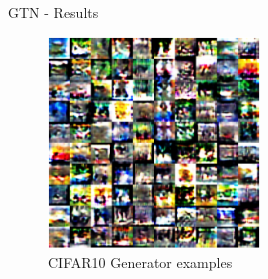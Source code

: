 \documentclass[10pt,usenames,dvipsnames]{beamer}
\begin{document}
\begin{frame}{GTN - Results}
    \begin{figure}
        \centering
        \includegraphics[width=0.5\textwidth]{figures/Examples.png}
        \caption{CIFAR10 Generator examples \cite{such2019generative}}
    \end{figure}
\end{frame}
\end{document}
